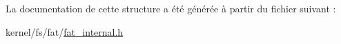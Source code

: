 \-La documentation de cette structure a été générée à partir du fichier suivant \-:\begin{DoxyCompactItemize}
\item 
kernel/fs/fat/\hyperlink{fat__internal_8h}{fat\-\_\-internal.\-h}\end{DoxyCompactItemize}
